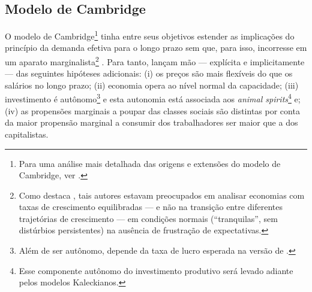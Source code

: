\subsection{Modelo de Cambridge}


O modelo de Cambridge\footnote{Para uma análise mais detalhada das origens e extensões do modelo de Cambridge, ver \textcite{baranzini_cambridge_2013}.} tinha entre seus objetivos estender as implicações do princípio da demanda efetiva para o longo prazo sem que, para isso, incorresse em um aparato marginalista\footnote{
	Como destaca \textcite[p.~127--133]{davidson_accumulation_1978}, tais autores estavam preocupados em analisar economias com taxas de crescimento equilibradas --- e não na transição entre diferentes trajetórias de crescimento --- em condições normais (``tranquilas'', sem distúrbios persistentes) na ausência de frustração de expectativas.
} \cites{kaldor_alternative_1955}{kaldor_model_1957}{robinson_model_1962}{pasinetti_rate_1962}. 
Para tanto, lançam mão --- explícita e implicitamente --- das seguintes hipóteses adicionais: 
	(i) os preços são mais flexíveis do que os salários no longo prazo; 
	(ii) economia opera ao nível normal da capacidade; 
	(iii) investimento é autônomo\footnote{Além de ser autônomo, depende da taxa de lucro esperada na versão de \textcite{robinson_model_1962}.} e esta autonomia está associada aos  \textit{animal spirits}\footnote{Esse componente autônomo do investimento produtivo será levado adiante pelos modelos Kaleckianos.} e;
	(iv) as propensões marginais a poupar das classes sociais são distintas por conta da maior propensão marginal a consumir dos trabalhadores ser maior que a dos capitalistas. 
	
